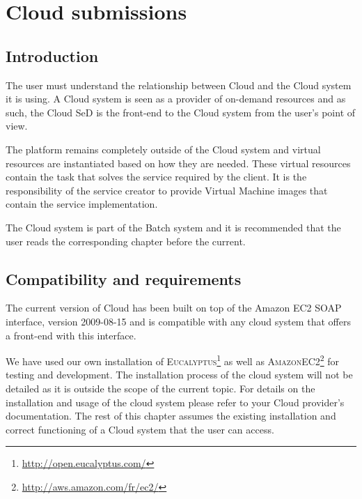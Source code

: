 

\chapter{Cloud submissions}\label{chapter:cloudSubmission}
\section{Introduction}

The user must understand the relationship between \diet Cloud and the Cloud system it is using.
A Cloud system is seen as a provider of on-demand resources and as such, the \diet Cloud SeD
is the front-end to the Cloud system from the \diet user's point of view.

The \diet platform remains completely outside of the Cloud system and virtual resources are
instantiated based on how they are needed. These virtual resources contain the task that solves
the service required by the \diet client. It is the responsibility of the \diet service
creator to provide Virtual Machine images that contain the service implementation. 

The \diet Cloud system is part of the \diet Batch system and it is recommended that the user
reads the corresponding chapter before the current.

\section{Compatibility and requirements}

The current version of \diet Cloud has been built on top of the Amazon EC2 SOAP interface,
version 2009-08-15 and is compatible with any cloud system that offers a front-end with
this interface.

We have used our own installation of
\textsc{Eucalyptus}\footnote{\url{http://open.eucalyptus.com/}}  as
well as
\textsc{AmazonEC2}\footnote{\url{http://aws.amazon.com/fr/ec2/}} for
testing and development. The installation process of the cloud system
will not be detailed as it is outside the scope of the current
topic. For details on the installation and usage of the cloud system
please refer to your Cloud provider's documentation. The rest of this
chapter assumes the existing installation and correct functioning of a
Cloud system that the user can access.

